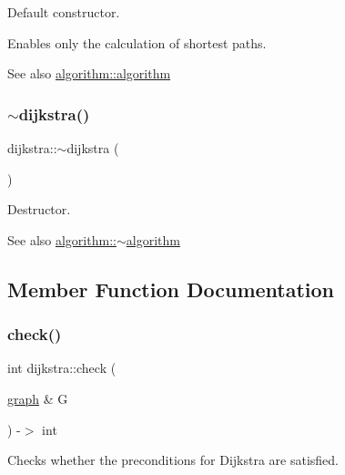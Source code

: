 Default constructor. 

Enables only the calculation of shortest paths.

\begin{DoxySeeAlso}{See also}
\mbox{\hyperlink{classalgorithm_ab79e1ddec2f2afdf4b36b10724db8b15}{algorithm\+::algorithm}} 
\end{DoxySeeAlso}
\mbox{\label{classdijkstra_a871e3c8097b7f0bc17358473b1149515}} 
\subsubsection{\texorpdfstring{$\sim$dijkstra()}{~dijkstra()}}
{\footnotesize\ttfamily dijkstra\+::$\sim$dijkstra (\begin{DoxyParamCaption}{ }\end{DoxyParamCaption})\hspace{0.3cm}{\ttfamily [virtual]}}



Destructor. 

\begin{DoxySeeAlso}{See also}
\mbox{\hyperlink{classalgorithm_adca9b1e7fa3afd914519a9dbb44e9fd5}{algorithm\+::$\sim$algorithm}} 
\end{DoxySeeAlso}


\subsection{Member Function Documentation}
\mbox{\label{classdijkstra_aec2427139f1e69d358153362a99257ba}} 
\subsubsection{\texorpdfstring{check()}{check()}}
{\footnotesize\ttfamily int dijkstra\+::check (\begin{DoxyParamCaption}\item[{\mbox{\hyperlink{classgraph}{graph}} \&}]{G }\end{DoxyParamCaption}) -\/$>$ int\hspace{0.3cm}{\ttfamily [virtual]}}



Checks whether the preconditions for Dijkstra are satisfied. 

